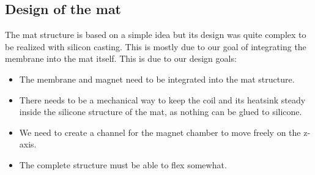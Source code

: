 \subsection{Design of the mat}
The mat structure is based on a simple idea but its design was quite complex to be realized with silicon casting. This is mostly due to our goal of integrating the membrane into the mat itself.
This is due to our design goals:
\begin{itemize}
    \item The membrane and magnet need to be integrated into the mat structure.
    \item There needs to be a mechanical way to keep the coil and its heatsink steady inside the silicone structure of the mat, as nothing can be glued to silicone.
    \item We need to create a channel for the magnet chamber to move freely on the z-axis.
    \item The complete structure must be able to flex somewhat.
\end{itemize}


